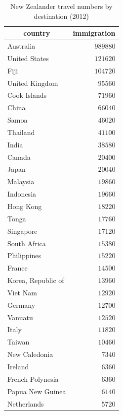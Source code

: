 \documentclass{article}
\begin{document}
\begin{itemize}

\begin{table}
\caption{New Zealander travel numbers by destination (2012)}
\begin{center}
\begin{tabular}{lr}
\hline\hline
\multicolumn{1}{c}{country}&\multicolumn{1}{c}{immigration}\tabularnewline
\hline
Australia&$989880$\tabularnewline
United States&$121620$\tabularnewline
Fiji&$104720$\tabularnewline
United Kingdom&$ 95560$\tabularnewline
Cook Islands&$ 71960$\tabularnewline
China&$ 66040$\tabularnewline
Samoa&$ 46020$\tabularnewline
Thailand&$ 41100$\tabularnewline
India&$ 38580$\tabularnewline
Canada&$ 20400$\tabularnewline
Japan&$ 20040$\tabularnewline
Malaysia&$ 19860$\tabularnewline
Indonesia&$ 19660$\tabularnewline
Hong Kong&$ 18220$\tabularnewline
Tonga&$ 17760$\tabularnewline
Singapore&$ 17120$\tabularnewline
South Africa&$ 15380$\tabularnewline
Philippines&$ 15220$\tabularnewline
France&$ 14500$\tabularnewline
Korea, Republic of&$ 13960$\tabularnewline
Viet Nam&$ 12920$\tabularnewline
Germany&$ 12700$\tabularnewline
Vanuatu&$ 12520$\tabularnewline
Italy&$ 11820$\tabularnewline
Taiwan&$ 10460$\tabularnewline
New Caledonia&$  7340$\tabularnewline
Ireland&$  6360$\tabularnewline
French Polynesia&$  6360$\tabularnewline
Papua New Guinea&$  6140$\tabularnewline
Netherlands&$  5720$\tabularnewline
\hline
\end{tabular}\end{center}\label{table:nztravel12}
\end{table}



\end{itemize}
\end{document}

